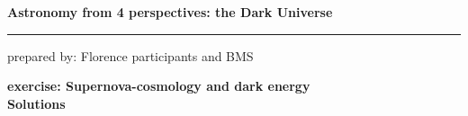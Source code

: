 \documentclass[a4paper,12pt]{article}
\newcommand{\HRule}{\rule{\linewidth}{0.3mm}}
\begin{document}
	\pagestyle{empty}
	
	\begin{center}
		\LARGE \textbf{Astronomy from 4 perspectives: the Dark Universe}
		\HRule
	\end{center}
	\begin{flushright}
		prepared by: Florence participants and BMS
	\end{flushright}
	\begin{center}
		{\Large \textbf{exercise: Supernova-cosmology and dark energy}}\\
		\vspace*{2mm}
		{\Large \textbf{Solutions}}
		
	\end{center}
	\vspace{5mm}
	
	\begin{enumerate}
		

\end{enumerate}
\end{document}
